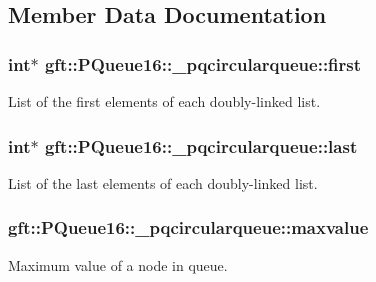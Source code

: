 \subsection{Member Data Documentation}
\hypertarget{structgft_1_1PQueue16_1_1__pqcircularqueue_aeda855ff236bb30b8269239931656ed7}{
\subsubsection[{first}]{\setlength{\rightskip}{0pt plus 5cm}int$\ast$ gft\-::\-P\-Queue16\-::\-\_\-pqcircularqueue\-::first}}\label{structgft_1_1PQueue16_1_1__pqcircularqueue_aeda855ff236bb30b8269239931656ed7}


List of the first elements of each doubly-\/linked list. 

\hypertarget{structgft_1_1PQueue16_1_1__pqcircularqueue_a6a74e64858b82a1b274731c5758ba162}{
\subsubsection[{last}]{\setlength{\rightskip}{0pt plus 5cm}int$\ast$ gft\-::\-P\-Queue16\-::\-\_\-pqcircularqueue\-::last}}\label{structgft_1_1PQueue16_1_1__pqcircularqueue_a6a74e64858b82a1b274731c5758ba162}


List of the last elements of each doubly-\/linked list. 

\hypertarget{structgft_1_1PQueue16_1_1__pqcircularqueue_acc9c8a89ad23c5a641fee6e38a2b7bd9}{
\subsubsection[{maxvalue}]{ gft\-::\-P\-Queue16\-::\-\_\-pqcircularqueue\-::maxvalue}}\label{structgft_1_1PQueue16_1_1__pqcircularqueue_acc9c8a89ad23c5a641fee6e38a2b7bd9}


Maximum value of a node in queue. 

